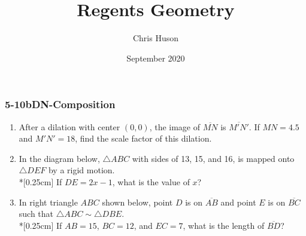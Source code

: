\documentclass[12pt, twoside]{article}
\title{Regents Geometry}
\author{Chris Huson}
\date{September 2020}
\begin{document}
\subsubsection*{5-10bDN-Composition}
\begin{enumerate}
\item After a dilation with center $(0,0)$, the image of $\overline{MN}$ is $\overline{M'N'}$. If $MN=4.5$ and $M'N'=18$, find the scale factor of this dilation. \vspace{3cm}

\item In the diagram below, $\triangle ABC$ with sides of 13, 15, and 16, is mapped onto $\triangle DEF$ by a rigid motion. \\*[0.25cm]
  If $DE=2x-1$, what is the value of $x$? 
      \begin{flushright}
      \end{flushright}
    \vspace{2cm}

\item In right triangle $ABC$ shown below, point $D$ is on $\overline{AB}$ and point $E$ is on $\overline{BC}$ such that $\triangle ABC \sim \triangle DBE$. \\*[0.25cm]
  If $AB=15$, $BC=12$, and $EC=7$, what is the length of $\overline{BD}$?
    \begin{flushright}
    \end{flushright}
    

\end{enumerate}
\end{document}
